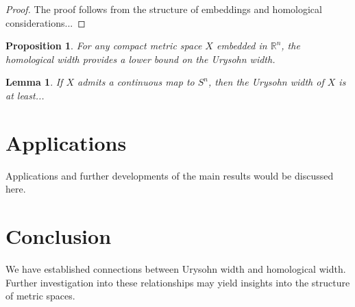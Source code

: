 \documentclass[12pt]{amsart}
\theoremstyle{plain}
\newtheorem{lemma}[theorem]{Lemma}
\newtheorem{proposition}[theorem]{Proposition}
\theoremstyle{definition}
\begin{document}
\begin{proof}
The proof follows from the structure of embeddings and homological considerations...
\end{proof}

\begin{proposition}
For any compact metric space $X$ embedded in $\mathbb{R}^n$, the homological width provides a lower bound on the Urysohn width.
\end{proposition}

\begin{lemma}
If $X$ admits a continuous map to $S^n$, then the Urysohn width of $X$ is at least...
\end{lemma}

\section{Applications}

Applications and further developments of the main results would be discussed here.

\section{Conclusion}

We have established connections between Urysohn width and homological width. Further investigation into these relationships may yield insights into the structure of metric spaces.



\end{document}

